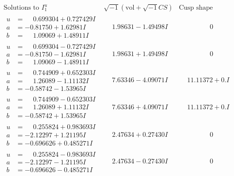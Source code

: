 \documentclass[1p]{elsarticle_modified}
\theoremstyle{definition}
\newcommand{\I}{\sqrt{-1}}
\begin{document}
$$\begin{array}{c|c|c}  
\text{Solutions to }I^u_{1}& \I (\text{vol} + \sqrt{-1}CS) & \text{Cusp shape}\\
 \hline 
\begin{aligned}
u &= \phantom{-}0.699304 + 0.727429 I \\
a &= -0.81750 + 1.62981 I \\
b &= \phantom{-}1.09069 + 1.48911 I\end{aligned}
 & \phantom{-}1.98631 - 1.49498 I & \phantom{-0.000000 } 0 \\ \hline\begin{aligned}
u &= \phantom{-}0.699304 - 0.727429 I \\
a &= -0.81750 - 1.62981 I \\
b &= \phantom{-}1.09069 - 1.48911 I\end{aligned}
 & \phantom{-}1.98631 + 1.49498 I & \phantom{-0.000000 } 0 \\ \hline\begin{aligned}
u &= \phantom{-}0.744909 + 0.652303 I \\
a &= \phantom{-}1.26089 - 1.11132 I \\
b &= -0.58742 - 1.53965 I\end{aligned}
 & \phantom{-}7.63346 - 4.09071 I & \phantom{-}11.11372 + 0. I\phantom{ +0.000000I} \\ \hline\begin{aligned}
u &= \phantom{-}0.744909 - 0.652303 I \\
a &= \phantom{-}1.26089 + 1.11132 I \\
b &= -0.58742 + 1.53965 I\end{aligned}
 & \phantom{-}7.63346 + 4.09071 I & \phantom{-}11.11372 + 0. I\phantom{ +0.000000I} \\ \hline\begin{aligned}
u &= \phantom{-}0.255824 + 0.983693 I \\
a &= -2.12297 + 1.21195 I \\
b &= -0.696626 + 0.485271 I\end{aligned}
 & \phantom{-}2.47634 + 0.27430 I & \phantom{-0.000000 } 0 \\ \hline\begin{aligned}
u &= \phantom{-}0.255824 - 0.983693 I \\
a &= -2.12297 - 1.21195 I \\
b &= -0.696626 - 0.485271 I\end{aligned}
 & \phantom{-}2.47634 - 0.27430 I & \phantom{-0.000000 } 0 \\ \hline\begin{aligned}

\end{aligned}
\end{array}$$
\end{document}
